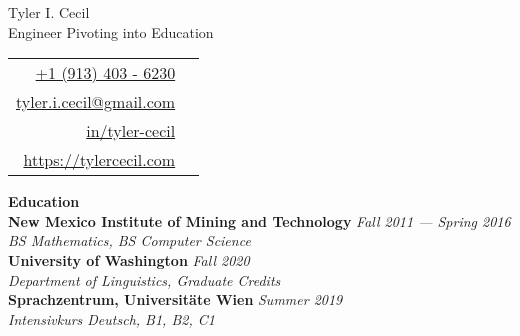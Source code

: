 \documentclass[11pt,a4paper,sans]{article}
\newcommand{\cvcolor}[1]{{\color{MidnightBlue}#1}}
\renewcommand{\section}[1]{
  \cvcolor{\noindent \textbf{\LARGE #1}}
  \vspace{.5em}\\
}
\begin{document}
\noindent
\begin{minipage}{0.675\linewidth}
  {
    \fontsize{40pt}{50pt}\selectfont
    \noindent
    Tyler I. Cecil
  }\\
  {\Large \color{darkgray}
    {
      \fontsize{16pt}{20pt}\selectfont
      \noindent
      Engineer Pivoting into Education
    }
  }
\end{minipage}
\hfill
{
  \fontsize{10pt}{13pt}\selectfont
  \begin{tabular}{|rl}
    \href{tel:+1 (913) 403 - 6230}{+1 (913) 403 - 6230}&\cvcolor{\faPhone} \\
    \href{mailto:tyler.i.cecil@gmail.com}{tyler.i.cecil@gmail.com}&\cvcolor{\faEnvelope} \\
    \href{https://www.linkedin.com/in/tyler-cecil/}{in/tyler-cecil}&\cvcolor{\faLinkedinSquare} \\
    \href{https://tylercecil.com}{https://tylercecil.com}&\cvcolor{\faGlobe} \\
  \end{tabular}
  }

\vspace{0.5em}
\noindent\hrulefill
\vspace{1em}

\section{Education}
\textbf{New Mexico Institute of Mining and Technology} \hfill \textsl{Fall 2011 --- Spring 2016}\\
\textsl{BS Mathematics, BS Computer Science}\\
\textbf{University of Washington} \hfill \textsl{Fall 2020}\\
\textsl{Department of Linguistics, Graduate Credits}\\
\textbf{Sprachzentrum, Universitäte Wien} \hfill \textsl{Summer 2019}\\
\textsl{Intensivkurs Deutsch, B1, B2, C1}\\
\end{document}
